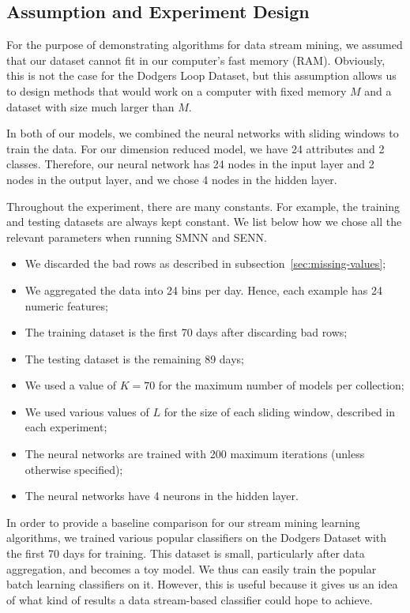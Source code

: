 \documentclass[conference]{IEEEtran}
\begin{document}
		\subsection{Assumption and Experiment Design}
		For the purpose of demonstrating algorithms for data stream mining, we assumed that our dataset cannot fit in our computer's fast memory (RAM). Obviously, this is not the case for the Dodgers Loop Dataset, but this assumption allows us to design methods that would work on a computer with fixed memory $M$ and a dataset with size much larger than $M$.
		
		In both of our models, we combined the neural networks with sliding windows to train the data. For our dimension reduced model, we have 24 attributes and 2 classes. Therefore, our neural network has 24 nodes in the input layer and 2 nodes in the output layer, and we chose 4 nodes in the hidden layer. 
		
		Throughout the experiment, there are many constants. For example, the training and testing datasets are always kept constant. We list below how we chose all the relevant parameters when running SMNN and SENN. 
		\begin{itemize}
			\item We discarded the bad rows as described in subsection~\ref{sec:missing-values};
			\item We aggregated the data into 24 bins per day. Hence, each example has 24 numeric features;
			\item The training dataset is the first 70 days after discarding bad rows;
			\item The testing dataset is the remaining 89 days;
			\item We used a value of $K=70$ for the maximum number of models per collection;
			\item We used various values of $L$ for the size of each sliding window, described in each experiment;
			\item The neural networks are trained with 200 maximum iterations (unless otherwise specified);
			\item The neural networks have 4 neurons in the hidden layer.
		\end{itemize}
		
		In order to provide a baseline comparison for our stream mining learning algorithms, we trained various popular classifiers on the Dodgers Dataset with the first 70 days for training. This dataset is small, particularly after data aggregation, and becomes a toy model. We thus can easily train the popular batch learning classifiers on it. However, this is useful because it gives us an idea of what kind of results a data stream-based classifier could hope to achieve.
		
\end{document}
